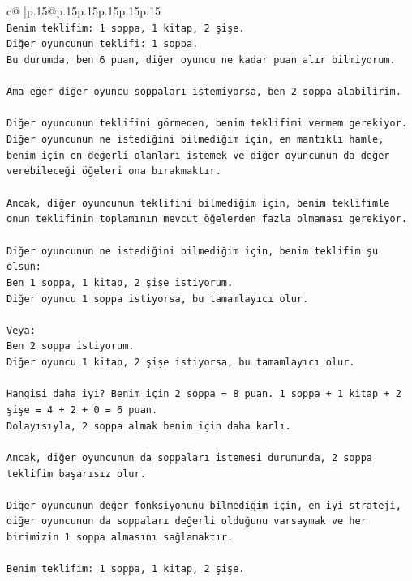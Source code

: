 \documentclass{article}
\begin{document}
{\begin{supertabular}{c@{$\;$}|p{.15\linewidth}@{}p{.15\linewidth}p{.15\linewidth}p{.15\linewidth}p{.15\linewidth}p{.15\linewidth}}
{{{\\ 
\texttt{Benim teklifim: 1 soppa, 1 kitap, 2 şişe.} \\
\texttt{Diğer oyuncunun teklifi: 1 soppa.} \\
\texttt{Bu durumda, ben 6 puan, diğer oyuncu ne kadar puan alır bilmiyorum.} \\
\\ 
\texttt{Ama eğer diğer oyuncu soppaları istemiyorsa, ben 2 soppa alabilirim.} \\
\\ 
\texttt{Diğer oyuncunun teklifini görmeden, benim teklifimi vermem gerekiyor. Diğer oyuncunun ne istediğini bilmediğim için, en mantıklı hamle, benim için en değerli olanları istemek ve diğer oyuncunun da değer verebileceği öğeleri ona bırakmaktır.} \\
\\ 
\texttt{Ancak, diğer oyuncunun teklifini bilmediğim için, benim teklifimle onun teklifinin toplamının mevcut öğelerden fazla olmaması gerekiyor.} \\
\\ 
\texttt{Diğer oyuncunun ne istediğini bilmediğim için, benim teklifim şu olsun:} \\
\texttt{Ben 1 soppa, 1 kitap, 2 şişe istiyorum.} \\
\texttt{Diğer oyuncu 1 soppa istiyorsa, bu tamamlayıcı olur.} \\
\\ 
\texttt{Veya:} \\
\texttt{Ben 2 soppa istiyorum.} \\
\texttt{Diğer oyuncu 1 kitap, 2 şişe istiyorsa, bu tamamlayıcı olur.} \\
\\ 
\texttt{Hangisi daha iyi? Benim için 2 soppa = 8 puan. 1 soppa + 1 kitap + 2 şişe = 4 + 2 + 0 = 6 puan.} \\
\texttt{Dolayısıyla, 2 soppa almak benim için daha karlı.} \\
\\ 
\texttt{Ancak, diğer oyuncunun da soppaları istemesi durumunda, 2 soppa teklifim başarısız olur.} \\
\\ 
\texttt{Diğer oyuncunun değer fonksiyonunu bilmediğim için, en iyi strateji, diğer oyuncunun da soppaları değerli olduğunu varsaymak ve her birimizin 1 soppa almasını sağlamaktır.} \\
\\ 
\texttt{Benim teklifim: 1 soppa, 1 kitap, 2 şişe.} \\
}}}
\end{supertabular}}
\end{document}
